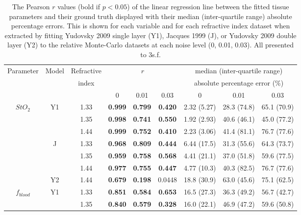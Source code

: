 \begin{table}[htb!]
    \centering
    \caption{The Pearson $r$ values (bold if $p<0.05$) of the linear regression line between the fitted tissue parameters and their ground truth displayed with their median (inter-quartile range) absolute percentage errors. This is shown for each variable and for each refractive index dataset when extracted by fitting Yudovsky 2009 single layer (Y1), Jacques 1999 (J), or Yudovsky 2009 double layer (Y2) to the relative Monte-Carlo datasets at each noise level (0, 0.01, 0.03). All presented to 3s.f.}
    \begin{tabular}{|ccc|ccc|ccc|}
        \hline
        Parameter & Model & Refractive & \multicolumn{3}{c}{$r$} & \multicolumn{3}{|c|}{median (inter-quartile range)} \\
        & & index & \multicolumn{3}{c}{} & \multicolumn{3}{|c|}{absolute percentage error (\%)} \\
        & & & 0 & 0.01 & 0.03 & 0 & 0.01 & 0.03 \\
        \hline
        \multirow{7}{*}{$StO_2$} & \multirow{3}{*}{Y1} & 1.33 & \textbf{0.999} & \textbf{0.799} & \textbf{0.420} & 2.32 (5.27) & 28.3 (74.8) & 65.1 (70.9) \\
        & & 1.35 & \textbf{0.998} & \textbf{0.741} & \textbf{0.550} & 1.92 (2.93) & 40.6 (46.1) & 45.0 (77.2) \\
        & & 1.44 & \textbf{0.999} & \textbf{0.752} & \textbf{0.410} & 2.23 (3.06) & 41.4 (81.1) & 76.7 (77.6) \\
        \cline{2-9}
        & \multirow{3}{*}{J} & 1.33 & \textbf{0.968} & \textbf{0.809} & \textbf{0.444} & 6.44 (17.5) & 31.3 (55.6) & 64.3 (73.7) \\
        & & 1.35 & \textbf{0.959} & \textbf{0.758} & \textbf{0.568} & 4.41 (21.1) & 37.0 (51.8) & 59.6 (77.5) \\
        & & 1.44 &  \textbf{0.977} & \textbf{0.755} & \textbf{0.447} & 4.77 (10.3) & 40.3 (82.5) & 76.7 (77.6) \\
        \cline{2-9}
        & Y2 & 1.44 & \textbf{0.679} & \textbf{0.198} & 0.0448 & 18.8 (30.9) & 63.0 (45.6) & 75.1 (62.5) \\
        \hline
        \multirow{7}{*}{$f_{blood}$} & \multirow{3}{*}{Y1} & 1.33 & \textbf{0.851} & \textbf{0.584} & \textbf{0.653} & 16.5 (27.3) & 36.3 (49.2) & 56.7 (42.7) \\
        & & 1.35 & \textbf{0.840} & \textbf{0.579} & \textbf{0.328} & 16.0 (22.1) & 46.9 (47.2) & 59.6 (50.8) \\

\end{tabular}
\end{table}
